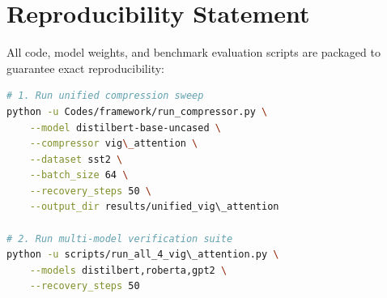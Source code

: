 \section{Reproducibility Statement}
All code, model weights, and benchmark evaluation scripts are packaged to guarantee exact reproducibility:
\begin{lstlisting}[language=bash]
# 1. Run unified compression sweep
python -u Codes/framework/run_compressor.py \
    --model distilbert-base-uncased \
    --compressor vig\_attention \
    --dataset sst2 \
    --batch_size 64 \
    --recovery_steps 50 \
    --output_dir results/unified_vig\_attention

# 2. Run multi-model verification suite
python -u scripts/run_all_4_vig\_attention.py \
    --models distilbert,roberta,gpt2 \
    --recovery_steps 50
\end{lstlisting}

